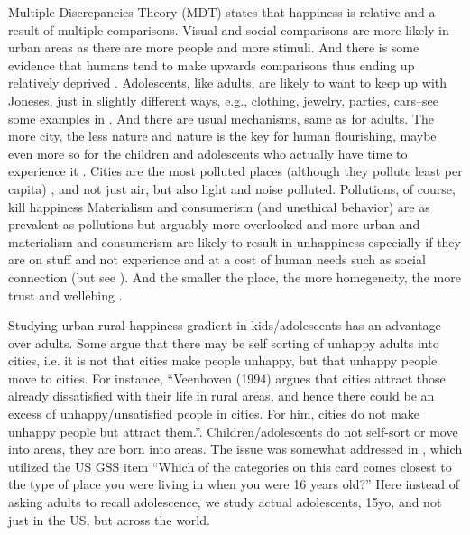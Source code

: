 \documentclass[10pt, letterpaper]{article}
\begin{document}
\begin{spacing}{1.4}
   Multiple Discrepancies Theory (MDT) \citep{michalos85,michalos14c} states that
happiness is relative and a result of multiple comparisons. Visual and social comparisons are more likely in
urban areas as there are more people and more stimuli. And there is some
evidence that humans tend to make upwards comparisons \citep{frey02s} thus
ending up relatively deprived \citep[e.g.,][]{luttmer05,frank12}. 
 Adolescents, like adults, are likely to want to keep up with Joneses, just in
slightly different ways, e.g., clothing, jewelry, parties, cars--see some
examples in \citet{frank12}.
 And there are usual mechanisms, same as for adults. The more city, the less
nature \cite{aokCityBook15} and nature is the key for human flourishing, maybe even more so for the children and
adolescents who actually have time to experience it \citep{pretty12}. Cities are
 the most polluted places (although they pollute least per capita) 
 \cite{meyer13}, and not just air, but also light and noise polluted. Pollutions,
 of course, kill happiness \cite{signoretta19,poonCL18jan29,leeTT16feb13,metcalfeCL16jun10,weinhold12,rehdanz08,welsch05,york03} 
 Materialism and consumerism (and unethical behavior) are as prevalent as pollutions but arguably more
 overlooked and more urban
 \citep[e.g.,][]{aok-sizeFetish17,okulicz2022materialism,morris21,wirth38} and
 materialism and consumerism are likely to result in unhappiness especially if
 they are on stuff and not experience and at a cost of human needs such as social connection
 \citep[e.g.,][]{frank12,leonard10,vanboven05,burroughs02,dumludag21} (but see
 \citet{wu20,wang17,brown19,brown17}). And the smaller the place, the more
 homegeneity, the more trust and wellebing \citep{putnam07,aok22,herbst14,vogt07}.


Studying urban-rural happiness gradient in kids/adolescents has an advantage
over adults. Some argue that there may be self sorting of unhappy adults into
cities, i.e. it is not that cities make people unhappy, but that unhappy people
move to cities. For instance, ``Veenhoven (1994) argues that cities attract
those already dissatisfied with their life in rural areas, and hence there could
be an excess of unhappy/unsatisfied people in cities. For him, cities do not
make unhappy people but attract them.''\citep[cited in
][]{ebshoy24}. Children/adolescents do not self-sort or move into areas, they
are born into areas. The issue was somewhat addressed in \citet{aok20}, which
utilized the US GSS item ``Which of the categories on this
card comes closest to the type of place you were living in when you were 16
years old?''
 Here instead of asking adults to recall adolescence, we study actual
adolescents, 15yo, and not just in the US, but across the world. 



\end{spacing}
\end{document}
